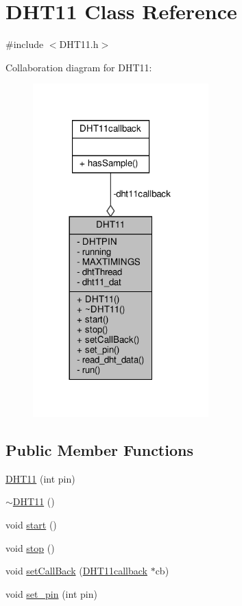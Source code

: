 \hypertarget{classDHT11}{}\section{D\+H\+T11 Class Reference}
\label{classDHT11}


{\ttfamily \#include $<$D\+H\+T11.\+h$>$}



Collaboration diagram for D\+H\+T11\+:
\nopagebreak
\begin{figure}[H]
\begin{center}
\leavevmode
\includegraphics[width=192pt]{classDHT11__coll__graph}
\end{center}
\end{figure}
\subsection*{Public Member Functions}
\begin{DoxyCompactItemize}
\item 
\hyperlink{classDHT11_ad52a70ab511e087aaad53848d64ee976}{D\+H\+T11} (int pin)
\item 
\hyperlink{classDHT11_af210e94620802c4dd3a32f826b9cc389}{$\sim$\+D\+H\+T11} ()
\item 
void \hyperlink{classDHT11_a09a0c99de09f1849342d436624251f1d}{start} ()
\item 
void \hyperlink{classDHT11_a53188c041b8c49557d328f18ffbdacd7}{stop} ()
\item 
void \hyperlink{classDHT11_aeb671153e6b5db00efdf2ab654c45cb6}{set\+Call\+Back} (\hyperlink{classDHT11callback}{D\+H\+T11callback} $\ast$cb)
\item 
void \hyperlink{classDHT11_aa39533ef269048f791167e05598757fe}{set\+\_\+pin} (int pin)
\end{DoxyCompactItemize}

